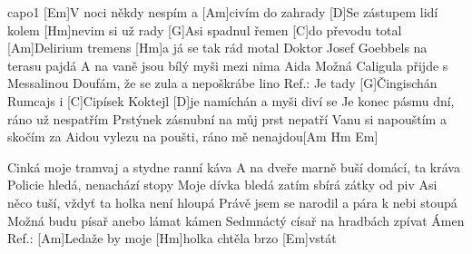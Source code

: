 \hfill capo1
[Em]V noci někdy nespím a [Am]civím do zahrady
[D]Se zástupem lidí kolem [Hm]nevim si už rady
[G]Asi spadnul řemen [C]do převodu total
[Am]Delirium tremens [Hm]a já se tak rád motal
Doktor Josef Goebbels na terasu pajdá
A na vaně jsou bílý myši mezi nima Aida
Možná Caligula přijde s Messalinou
Doufám, že se zula a nepoškrábe lino
Ref.: Je tady [G]\null Čingischán Rumcajs i [C]Cipísek
Koktejl [D]je namíchán a myši diví se
Je konec pásmu dní, ráno už nespatřím
Prstýnek zásnubní na můj prst nepatří
Vanu si napouštím a skočím za Aidou
vylezu na poušti,
ráno mě nenajdou[Am Hm Em]

Cinká moje tramvaj a stydne ranní káva
A na dveře marně buší domácí, ta kráva
Policie hledá, nenachází stopy
Moje dívka bledá zatím sbírá zátky od piv
Asi něco tuší, vždyť ta holka není hloupá
Právě jsem se narodil a pára k nebi stoupá
Možná budu písař anebo lámat kámen
Sedmnáctý císař na hradbách zpívat Ámen
Ref.: 
[Am]Ledaže by moje [Hm]holka chtěla brzo [Em]vstát\columnbreak